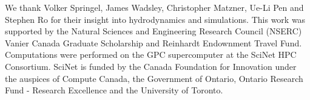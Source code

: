 We thank Volker Springel, James Wadsley, Christopher Matzner, Ue-Li Pen and Stephen Ro for their insight into hydrodynamics and simulations.  This work was supported by the Natural Sciences and Engineering Research Council (NSERC) Vanier Canada Graduate Scholarship and Reinhardt Endownment Travel Fund.  Computations were performed on the GPC supercomputer at the SciNet HPC Consortium.  SciNet \citep{loke+10} is funded by the Canada Foundation for Innovation under the auspices of Compute Canada, the Government of Ontario, Ontario Research Fund - Research Excellence and the University of Toronto.

